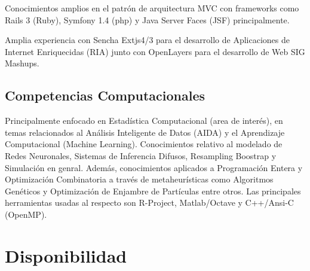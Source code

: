 \documentclass[11pt,letterpaper,roman]{moderncv}
\begin{document}
 {Conocimientos amplios en el patrón de arquitectura
MVC con frameworks como Rails 3 (Ruby), Symfony 1.4 (php) y Java Server Faces
(JSF) principalmente.}


 {Amplia experiencia con Sencha Extjs4/3 para el
desarrollo de Aplicaciones de Internet Enriquecidas (RIA) junto con OpenLayers
para el desarrollo de Web SIG Mashups. }

\subsection{Competencias Computacionales}  {Principalmente enfocado en Estadística Computacional (area de
interés), en temas relacionados al Análisis Inteligente de Datos (AIDA) y el
Aprendizaje Computacional (Machine Learning). Conocimientos relativo al modelado
de Redes Neuronales, Sistemas de Inferencia Difusos, Resampling Boostrap y
Simulación en genral. Además, conocimientos aplicados a Programación Entera y
Optimización Combinatoria a través de metaheurísticas como Algoritmos Genéticos
y Optimización de Enjambre de Partículas entre otros. Las principales
herramientas usadas al respecto son R-Project, Matlab/Octave y C++/Ansi-C
(OpenMP).}

\section{Disponibilidad}  
\end{document}
